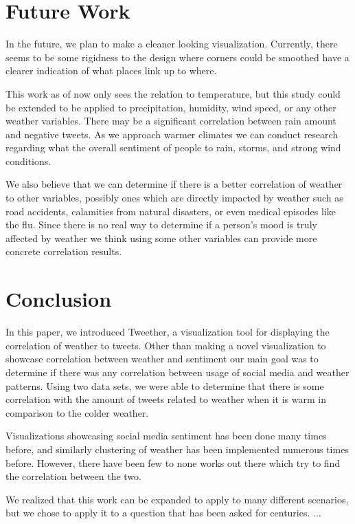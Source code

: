 \documentclass[journal]{vgtc}                %
\begin{document}
\newpage

\section{Future Work}

In the future, we plan to make a cleaner looking visualization. Currently, there seems to be some rigidness to the design where corners could be smoothed have a clearer indication of what places link up to where. 

This work as of now only sees the relation to temperature, but this study could be extended to be applied to precipitation, humidity, wind speed, or any other weather variables. There may be a significant correlation between rain amount and negative tweets. As we approach warmer climates we can conduct research regarding what the overall sentiment of people to rain, storms, and strong wind conditions.

We also believe that we can determine if there is a better correlation of weather to other variables, possibly ones which are directly impacted by weather such as road accidents, calamities from natural disasters, or even medical episodes like the flu. Since there is no real way to determine if a person's mood is truly affected by weather we think using some other variables can provide more concrete correlation results.



\section{Conclusion}

In this paper, we introduced Tweether, a visualization tool for displaying the correlation of weather to tweets. Other than making a novel visualization to showcase correlation between weather and sentiment our main goal was to determine if there was any correlation between usage of social media and weather patterns. Using two data sets, we were able to determine that there is some correlation with the amount of tweets related to weather when it is warm in comparison to the colder weather. 

Visualizations showcasing social media sentiment has been done many times before, and similarly clustering of weather has been implemented numerous times before. However, there have been few to none works out there which try to find the correlation between the two. 

We realized that this work can be expanded to apply to many different scenarios, but we chose to apply it to a question that has been asked for centuries. ...
\end{document}
